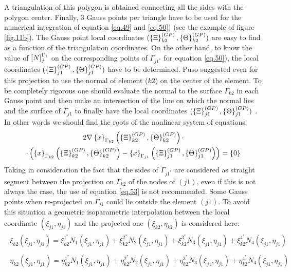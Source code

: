 A triangulation of this polygon is obtained connecting all the sides with the polygon center. Finally, 3 Gauss points per triangle have to be used for the numerical integration of equation \eqref{eq.49} and \eqref{eq.50}) (see the example of figure \ref{fig.11b}). The Gauss point local coordinates  $(\left\lbrace{\Xi}\right \rbrace_{k2}^{(GP)},\left\lbrace{\Theta}\right \rbrace_{k2}^{(GP)})$ are easy to find as a function of the triangulation coordinates. On the other hand, to know the value of $\left[{N}\right]_{j}^{\Gamma_1}$ on the corresponding points of $\Gamma_{j1^*}$ for equation \eqref{eq.50}), the local coordinates  $(\left\lbrace{\Xi}\right \rbrace_{j1}^{(GP)},\left\lbrace{\Theta}\right \rbrace_{j1}^{(GP)})$  have to be determined. Puso suggested even for this projection to use the normal of element ($k2$) on the center of the element. To be completely rigorous one should evaluate the normal to the surface $\Gamma_{k2}$ in each Gauss point and then make an intersection of the line on which the normal lies and the surface of $\Gamma_{j1}$ to finally have the local coordinates $(\left\lbrace{\Xi}\right \rbrace_{j1}^{(GP)},\left\lbrace{\Theta}\right \rbrace_{j1}^{(GP)})$ . In other words we should find the roots of the nonlinear system of equations:
\begin{multline}
\label{eq.53}
2\nabla\left\lbrace{x}\right \rbrace_{\Gamma_{k2}}\left(\left\lbrace{\Xi}\right \rbrace_{k2}^{(GP)},\left\lbrace{\Theta}\right \rbrace_{k2}^{(GP)}\right)\cdot \\ \cdot\left( \left\lbrace{x}\right \rbrace_{\Gamma_{k2}}\left(\left\lbrace{\Xi}\right \rbrace_{k2}^{(GP)},\left\lbrace{\Theta}\right \rbrace_{k2}^{(GP)}\right)-\left\lbrace{x}\right \rbrace_{\Gamma_{j1}}\left(\left\lbrace{\Xi}\right \rbrace_{j1}^{(GP)},\left\lbrace{\Theta}\right \rbrace_{j1}^{(GP)}\right)\right)= \left\lbrace{0}\right \rbrace
\end{multline}
Taking in consideration the fact that the sides of $\Gamma_{j1^*}$ are considered as straight segment between the projection on  $\Gamma_{k2}$ of the nodes of $(j1)$, even if this is not always the case, the use of equation \eqref{eq.53} is not recommended. Some Gauss points when re-projected on $\Gamma_{j1}$ could lie outside the element $(j1)$. To avoid this situation a geometric isoparametric interpolation between the local coordinate $(\xi_{j1},\eta_{j1})$ and the projected one $(\xi_{k2},\eta_{k2})$ is considered here:
\begin{eqnarray}
\label{eq.54}
\begin{aligned}
\xi_{k2}\left(\xi_{j1},\eta_{j1}\right)=\xi_{k2}^{1^*}N_1\left( \xi_{j1},\eta_{j1}\right)+\xi_{k2}^{2^*}N_2\left( \xi_{j1},\eta_{j1}\right)+\xi_{k2}^{3^*}N_3\left( \xi_{j1},\eta_{j1}\right)+\xi_{k2}^{4^*}N_4\left( \xi_{j1},\eta_{j1}\right)
\end{aligned} \\
\label{eq.55}
\begin{aligned}
\eta_{k2}\left(\xi_{j1},\eta_{j1}\right)=\eta_{k2}^{1^*}N_1\left( \xi_{j1},\eta_{j1}\right)+\eta_{k2}^{2^*}N_2\left( \xi_{j1},\eta_{j1}\right)+\eta_{k2}^{3^*}N_3\left( \xi_{j1},\eta_{j1}\right)+\eta_{k2}^{4^*}N_4\left( \xi_{j1},\eta_{j1}\right) 
\end{aligned} 
\end{eqnarray}
